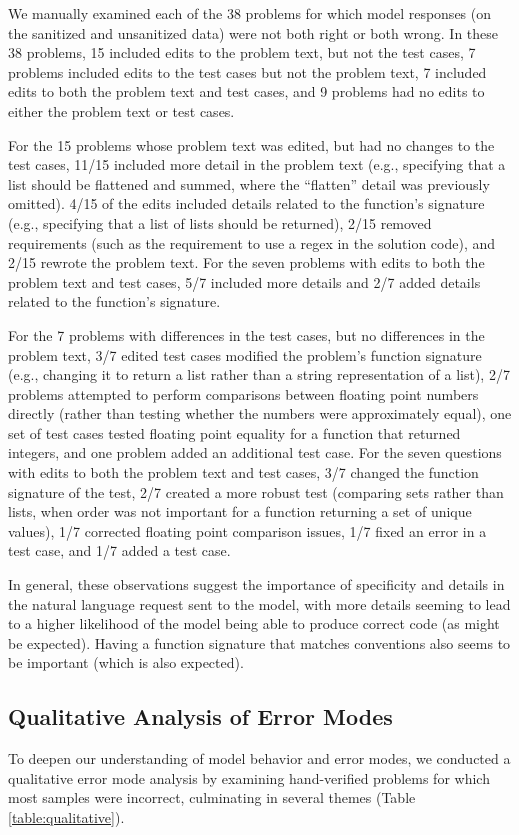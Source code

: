 We manually examined each of the 38 problems for which model responses (on the sanitized and unsanitized data) were not both right or both wrong. In these 38 problems, 15 included edits to the problem text, but not the test cases, 7 problems included edits to the test cases but not the problem text, 7 included edits to both the problem text and test cases, and 9 problems had no edits to either the problem text or test cases.

For the 15 problems whose problem text was edited, but had no changes to the test cases, 11/15 included more detail in the problem text (e.g., specifying that a list should be flattened and summed, where the ``flatten'' detail was previously omitted). 4/15 of the edits included details related to the function's signature (e.g., specifying that a list of lists should be returned), 2/15 removed requirements (such as the requirement to use a regex in the solution code), and 2/15 rewrote the problem text. For the seven problems with edits to both the problem text and test cases, 5/7 included more details and 2/7 added details related to the function's signature.

For the 7 problems with differences in the test cases, but no differences in the problem text, 3/7 edited test cases modified the problem's function signature (e.g., changing it to return a list rather than a string representation of a list), 2/7 problems attempted to perform comparisons between floating point numbers directly (rather than testing whether the numbers were approximately equal), one set of test cases tested floating point equality for a function that returned integers, and one problem added an additional test case. For the seven questions with edits to both the problem text and test cases, 3/7 changed the function signature of the test, 2/7 created a more robust test (comparing sets rather than lists, when order was not important for a function returning a set of unique values), 1/7 corrected floating point comparison issues, 1/7 fixed an error in a test case, and 1/7 added a test case.

In general, these observations suggest the importance of specificity and details in the natural language request sent to the model, with more details seeming to lead to a higher likelihood of the model being able to produce correct code (as might be expected). Having a function signature that matches conventions also seems to be important (which is also expected).

\subsection{Qualitative Analysis of Error Modes} To deepen our understanding of model behavior and error modes, we conducted a qualitative error mode analysis by examining hand-verified problems for which most samples were incorrect, culminating in several themes (Table \ref{table:qualitative}).

